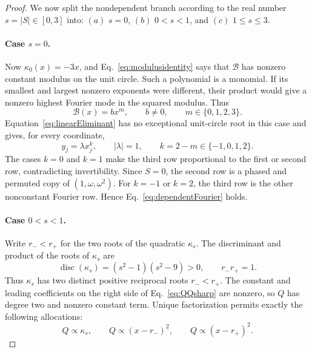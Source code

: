 \documentclass[aps,prx,reprint,nofootinbib,twoside,superscriptaddress,longbibliography,floatfix]{revtex4-2}
\theoremstyle{definition}
\begin{document}
\begin{proof}
We now split the nondependent branch according to the real number $s=|S|\in[0,3]$ into: $(a)$ $s=0$, $(b)$ $0<s<1$, and $(c)$ $1\leq s\leq3$.

\paragraph{\texorpdfstring{Case $s=0$}{Case s=0}.}

Now $\kappa_0(x)=-3x$, and Eq.~\eqref{eq:modulusidentity} says that $\mathcal B$ has nonzero constant modulus on the unit circle. Such a polynomial is a monomial. If its smallest and largest nonzero exponents were different, their product would give a nonzero highest Fourier mode in the squared modulus.  Thus
\begin{equation}
\mathcal B(x)=b x^m,
\qquad b\neq0,
\qquad m\in\{0,1,2,3\}.
\label{eq:Bmonomial}
\end{equation}
Equation~\eqref{eq:linearEliminant} has no exceptional unit-circle root in this case and gives, for every coordinate,
\begin{equation}
y_j=\lambda x_j^k,
\qquad |\lambda|=1,
\qquad k=2-m\in\{-1,0,1,2\}.
\label{eq:powerrelation}
\end{equation}
The cases $k=0$ and $k=1$ make the third row proportional to the first or second row, contradicting invertibility.  Since $S=0$, the second row is a phased and permuted copy of $(1,\omega,\omega^2)$.  For $k=-1$ or $k=2$, the third row is the other nonconstant Fourier row.  Hence Eq.~\eqref{eq:dependentFourier} holds.

\paragraph{\texorpdfstring{Case $0<s<1$}{Case 0<s<1}.}

Write $r_-<r_+$ for the two roots of the quadratic $\kappa_s$. The discriminant and product of the roots of $\kappa_s$ are
\begin{equation}
\operatorname{disc}(\kappa_s)=(s^2-1)(s^2-9)>0,
\qquad r_-r_+=1.
\label{eq:kappadiscriminant}
\end{equation}
Thus $\kappa_s$ has two distinct positive reciprocal roots $r_-<r_+$.  The constant and leading coefficients on the right side of Eq.~\eqref{eq:QQsharp} are nonzero, so $Q$ has degree two and nonzero constant term.  Unique factorization permits exactly the following allocations:
\begin{equation}
Q\propto\kappa_s,
\qquad
Q\propto(x-r_-)^2,
\qquad
Q\propto(x-r_+)^2.
\label{eq:rootallocations}
\end{equation}


\end{proof}
\end{document}
